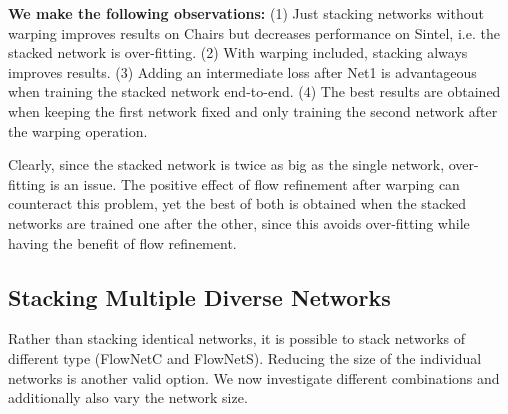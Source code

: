 \documentclass[10pt,twocolumn,letterpaper]{article}%
\newcommand{\chairs}{\mbox{Chairs}\xspace}
\newcommand{\neta}{Net1\xspace}
\begin{document}
\textbf{We make the following observations:}
(1) Just stacking networks without warping improves results on \chairs but decreases performance on Sintel, i.e. the stacked network is over-fitting. 
(2) With warping included, stacking always improves results. 
(3) Adding an intermediate loss after \neta is advantageous when training the stacked network end-to-end. 
(4) The best results are obtained when keeping the first network fixed and only training the second network after the warping operation. 

Clearly, since the stacked network is twice as big as the single network, over-fitting is an issue. The positive effect of flow refinement after warping can counteract this problem, yet the best of both is obtained when the stacked networks are trained one after the other, since this avoids over-fitting while having the benefit of flow refinement.  




\subsection{Stacking Multiple Diverse Networks}

Rather than stacking identical networks, it is possible to stack networks of different type (FlowNetC and FlowNetS). 
Reducing the size of the individual networks is another valid option. We now investigate different combinations and additionally also vary the network size. 
\end{document}
